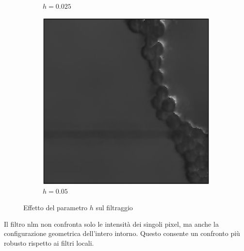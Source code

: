 \documentclass[../main.tex]{subfiles}
\begin{document}
\begin{figure}[ht]
\begin{subfigure}{0.32\linewidth}
		\caption{$h = 0.025$}
	\end{subfigure}
	\begin{subfigure}{0.32\linewidth}
		\includegraphics[keepaspectratio, width=\linewidth]{images/nlm_005.png}
		\caption{$h = 0.05$}
	\end{subfigure}
	\caption{Effetto del parametro $h$ sul filtraggio}
\end{figure}

Il filtro \acrshort{nlm} non confronta solo le intensità dei singoli pixel, ma anche la configurazione geometrica dell'intero intorno. Questo consente un confronto più robusto rispetto ai filtri locali.
\end{document}
